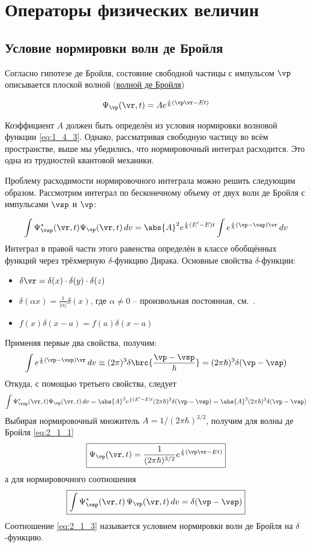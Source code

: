 \chapter{Операторы физических величин}

\section{Условие нормировки волн де Бройля}

Согласно гипотезе де Бройля, состояние свободной частицы с импульсом $\vp$ описывается плоской волной (\underline{волной де Бройля})

\begin{equation}
\label{eq:2_1_1}
\Psi_{\vp}(\vr,t) = A e^{\frac{i}{\hbar}(\vp\vr-Et)}
\end{equation}


Коэффициент $A$ должен быть определён из условия нормировки волновой функции \eqref{eq:1_4_3}. Однако, рассматривая свободную частицу во всём пространстве, выше мы убедились, что нормировочный интеграл расходится. Это одна из трудностей квантовой механики.

Проблему расходимости нормировочного интеграла можно решить следующим образом. Рассмотрим интеграл по бесконечному объему от двух волн де Бройля с импульсами $\vsp$ и $\vp$:

$$
\int \Psi^*_{\vsp}(\vr,t) \Psi_{\vp}(\vr,t) \, dv = 
  \abs{A}^2 e^{\frac{i}{\hbar}(E' - E)t} \int e^{\frac{i}{\hbar}(\vp - \vsp)\vr} \, dv
$$%
%
Интеграл в правой части этого равенства определён в классе обобщённых функций через трёхмерную $\delta$-функцию Дирака. Основные свойства $\delta$-функции:
\begin{itemize}
\item $\delta {\vr} = \delta (x) \cdot \delta (y) \cdot \delta (z) $
\item $\delta (\alpha x) = \frac{1}{|\alpha|} \delta (x)$, где $\alpha \ne 0$ -- произвольная постоянная, см.~.
\item $f(x) \delta (x - a) = f(a) \delta(x-a)$
\end{itemize}%
%
Применяя первые два свойства, получим:
$$
\int e^{\frac{i}{\hbar}(\vp - \vsp)\vr} \, dv \equiv
  (2 \pi )^3 \delta \brc{\frac{\vp - \vsp}{\hbar}} =
  (2 \pi \hbar)^3 \delta (\vp - \vsp)
$$%
%
Откуда, с помощью третьего свойства, следует
$$
\int \Psi^*_{\vsp}(\vr,t) \Psi_{\vp}(\vr,t) \, dv = 
  \abs{A}^2 e^{\frac{i}{\hbar}(E' - E)t} (2 \pi \hbar)^3 \delta (\vp - \vsp) =
  \abs{A}^2 (2 \pi \hbar)^3 \delta (\vp - \vsp)
$$%
%
Выбирая нормировочный множитель $A = 1/(2 \pi \hbar)^{3/2}$, получим для волны де Бройля \eqref{eq:2_1_1}%
%
\begin{equation}
\label{eq:2_1_2}
\boxed{\Psi_{\vp}(\vr,t) = \frac{1}{(2 \pi \hbar)^{3/2}} e^{\frac{i}{\hbar} (\vp \vr - Et)}}
\end{equation}%
%
а для нормировочного соотношения
\begin{equation}
\label{eq:2_1_3}
\boxed{\int\Psi^*_{\vsp}(\vr,t) \, \Psi_{\vp}(\vr,t) \, dv = \delta (\vp - \vsp)}
\end{equation}%
%
Соотношение \eqref{eq:2_1_3} называется условием нормировки волн де Бройля на $\delta$-функцию.

